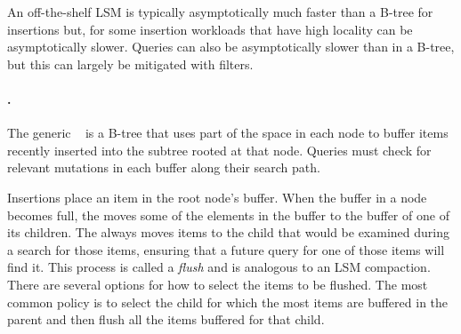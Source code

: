 


An off-the-shelf LSM is typically
asymptotically much faster than a B-tree for insertions but, for some
insertion workloads that have high locality can be asymptotically slower.  Queries can also be
asymptotically slower than in a B-tree, but this can largely be
mitigated with filters.

\paragraph{\Bets.} The generic \bet~\cite{!brodal:fagerberg:dictionaries:lower:bounds}
is
a B-tree that uses part of the space in each node to buffer items
recently inserted into the subtree rooted at that node.  Queries must
check for relevant mutations in each buffer along their search path.

Insertions place an item in the root node's buffer.  When the buffer
in a node becomes full, the \bet moves some of the
elements in the buffer to the buffer of one of its children.  The \bet
always moves items to the child that would be examined during a search
for those items, ensuring that a future query for one of those items
will find it. This process is called a \emph{flush} and is analogous
to an LSM compaction.  There are several options for how to select the
items to be flushed.  The most common policy is to select the child
for which the most items are buffered in the parent and then flush
all the items buffered for that child.  

